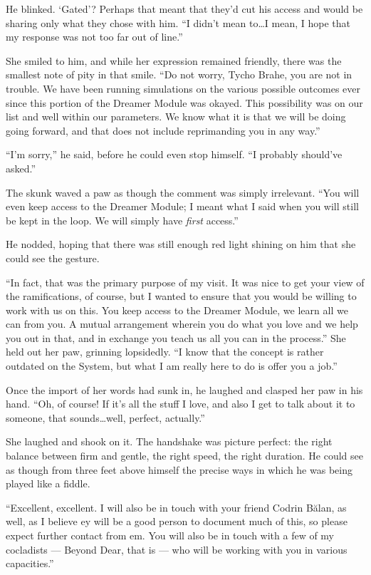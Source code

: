 He blinked. `Gated'? Perhaps that meant that they'd cut his access and would be sharing only what they chose with him. ``I didn't mean to\ldots I mean, I hope that my response was not too far out of line.''

She smiled to him, and while her expression remained friendly, there was the smallest note of pity in that smile. ``Do not worry, Tycho Brahe, you are not in trouble. We have been running simulations on the various possible outcomes ever since this portion of the Dreamer Module was okayed. This possibility was on our list and well within our parameters. We know what it is that we will be doing going forward, and that does not include reprimanding you in any way.''

``I'm sorry,'' he said, before he could even stop himself. ``I probably should've asked.''

The skunk waved a paw as though the comment was simply irrelevant. ``You will even keep access to the Dreamer Module; I meant what I said when you will still be kept in the loop. We will simply have \emph{first} access.''

He nodded, hoping that there was still enough red light shining on him that she could see the gesture.

``In fact, that was the primary purpose of my visit. It was nice to get your view of the ramifications, of course, but I wanted to ensure that you would be willing to work with us on this. You keep access to the Dreamer Module, we learn all we can from you. A mutual arrangement wherein you do what you love and we help you out in that, and in exchange you teach us all you can in the process.'' She held out her paw, grinning lopsidedly. ``I know that the concept is rather outdated on the System, but what I am really here to do is offer you a job.''

Once the import of her words had sunk in, he laughed and clasped her paw in his hand. ``Oh, of course! If it's all the stuff I love, and also I get to talk about it to someone, that sounds\ldots well, perfect, actually.''

She laughed and shook on it. The handshake was picture perfect: the right balance between firm and gentle, the right speed, the right duration. He could see as though from three feet above himself the precise ways in which he was being played like a fiddle.

``Excellent, excellent. I will also be in touch with your friend Codrin Bălan, as well, as I believe ey will be a good person to document much of this, so please expect further contact from em. You will also be in touch with a few of my cocladists — Beyond Dear, that is — who will be working with you in various capacities.''

